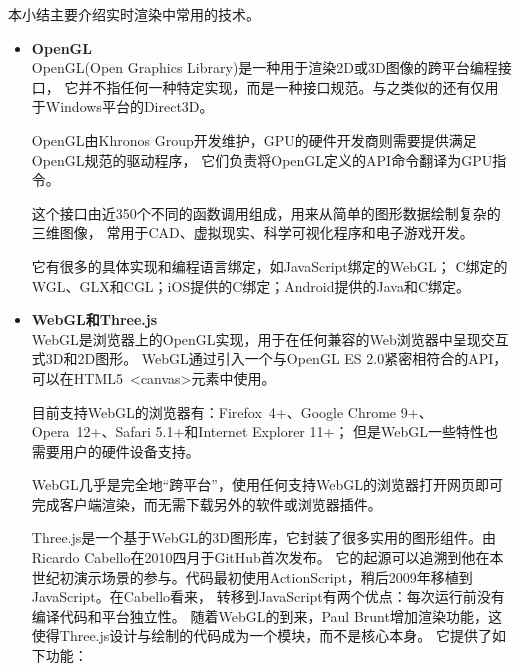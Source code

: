 本小结主要介绍实时渲染中常用的技术。

\begin{itemize}

    \item \textbf{OpenGL} \\


    OpenGL(Open Graphics Library)是一种用于渲染2D或3D图像的跨平台编程接口\cite{opengl}，
    它并不指任何一种特定实现，而是一种接口规范。与之类似的还有仅用于Windows平台的Direct3D。

    OpenGL由Khronos Group开发维护，GPU的硬件开发商则需要提供满足OpenGL规范的驱动程序，
    它们负责将OpenGL定义的API命令翻译为GPU指令。

    这个接口由近350个不同的函数调用组成，用来从简单的图形数据绘制复杂的三维图像，
    常用于CAD、虚拟现实、科学可视化程序和电子游戏开发。 

    它有很多的具体实现和编程语言绑定，如JavaScript绑定的WebGL；
    C绑定的WGL、GLX和CGL；iOS提供的C绑定；Android提供的Java和C绑定。


    \item \textbf{WebGL和Three.js} \\


    WebGL是浏览器上的OpenGL实现，用于在任何兼容的Web浏览器中呈现交互式3D和2D图形\cite{webgl}。
    WebGL通过引入一个与OpenGL ES 2.0紧密相符合的API，可以在HTML5 <canvas>元素中使用。

    目前支持WebGL的浏览器有：Firefox 4+、Google Chrome 9+、Opera 12+、Safari 5.1+和Internet Explorer 11+；
    但是WebGL一些特性也需要用户的硬件设备支持。

    WebGL几乎是完全地“跨平台”，使用任何支持WebGL的浏览器打开网页即可完成客户端渲染，而无需下载另外的软件或浏览器插件。

    Three.js是一个基于WebGL的3D图形库\cite{threejs}，它封装了很多实用的图形组件。由Ricardo Cabello在2010四月于GitHub首次发布。
    它的起源可以追溯到他在本世纪初演示场景的参与。代码最初使用ActionScript，稍后2009年移植到JavaScript。在Cabello看来，
    转移到JavaScript有两个优点：每次运行前没有编译代码和平台独立性。
    随着WebGL的到来，Paul Brunt增加渲染功能，这使得Three.js设计与绘制的代码成为一个模块，而不是核心本身。
    它提供了如下功能：


\end{itemize}
